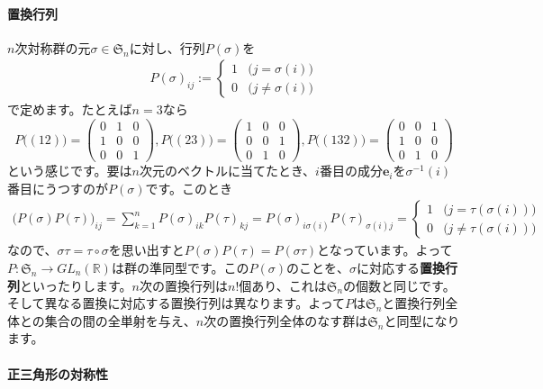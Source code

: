 \paragraph{置換行列}

$n$次対称群の元$\sigma \in \mathfrak{S}_n$に対し、行列$P(\sigma)$を
\begin{align*}
P(\sigma)_{ij} :=
\begin{cases}
1 & \bigl(j = \sigma(i)\bigr) \\
0 & \bigl(j \neq \sigma(i)\bigr)
\end{cases}
\end{align*}
で定めます。たとえば$n = 3$なら
\[
P\bigl((12)\bigr)
=
\begin{pmatrix}
0 & 1 & 0 \\
1 & 0 & 0 \\
0 & 0 & 1
\end{pmatrix}, 
P\bigl((23)\bigr)
=
\begin{pmatrix}
1 & 0 & 0 \\
0 & 0 & 1 \\
0 & 1 & 0
\end{pmatrix}, 
P\bigl((132)\bigr)
=
\begin{pmatrix}
0 & 0 & 1 \\
1 & 0 & 0 \\
0 & 1 & 0
\end{pmatrix}
\]
という感じです。要は$n$次元のベクトルに当てたとき、$i$番目の成分$\bm{e}_i$を$\sigma^{-1}(i)$番目にうつすのが$P(\sigma)$です。このとき
\begin{align*}
\bigl(P(\sigma) P(\tau)\bigr)_{ij}
= \sum_{k = 1}^n P(\sigma)_{ik} P(\tau)_{kj}
= P(\sigma)_{i \sigma(i)}P(\tau)_{\sigma(i)j}
=
\begin{cases}
1 & \bigl(j = \tau(\sigma(i))\bigr) \\
0 & \bigl(j \neq \tau(\sigma(i))\bigr)
\end{cases}
\end{align*}
なので、$\sigma \tau = \tau \circ \sigma$を思い出すと$P(\sigma)P(\tau) = P(\sigma\tau)$となっています。よって$P\colon \mathfrak{S}_n \rightarrow GL_n(\mathbb{R})$は群の準同型です。この$P(\sigma)$のことを、$\sigma$に対応する\textbf{置換行列}といったりします。$n$次の置換行列は$n!$個あり、これは$\mathfrak{S}_n$の個数と同じです。そして異なる置換に対応する置換行列は異なります。よって$P$は$\mathfrak{S}_n$と置換行列全体との集合の間の全単射を与え、$n$次の置換行列全体のなす群は$\mathfrak{S}_n$と同型になります。

\paragraph{正三角形の対称性}

